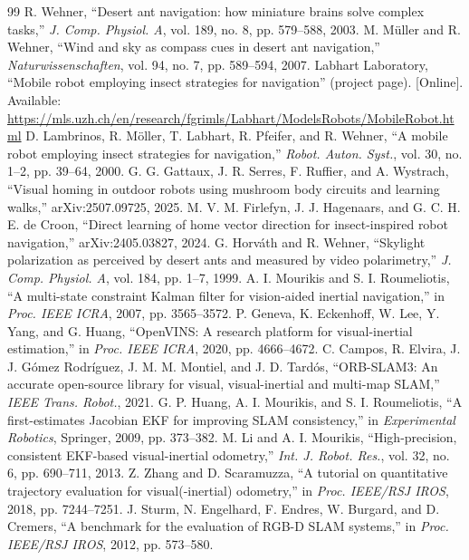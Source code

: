 \begin{thebibliography}{99}
 R. Wehner, ``Desert ant navigation: how miniature brains solve complex tasks,'' \emph{J. Comp. Physiol. A}, vol. 189, no. 8, pp. 579--588, 2003.
 M. M\"uller and R. Wehner, ``Wind and sky as compass cues in desert ant navigation,'' \emph{Naturwissenschaften}, vol. 94, no. 7, pp. 589--594, 2007.
 Labhart Laboratory, ``Mobile robot employing insect strategies for navigation'' (project page). [Online]. Available: \url{https://mls.uzh.ch/en/research/fgrimls/Labhart/ModelsRobots/MobileRobot.html}
 D. Lambrinos, R. M\"oller, T. Labhart, R. Pfeifer, and R. Wehner, ``A mobile robot employing insect strategies for navigation,'' \emph{Robot. Auton. Syst.}, vol. 30, no. 1--2, pp. 39--64, 2000.
 G. G. Gattaux, J. R. Serres, F. Ruffier, and A. Wystrach, ``Visual homing in outdoor robots using mushroom body circuits and learning walks,'' arXiv:2507.09725, 2025.
 M. V. M. Firlefyn, J. J. Hagenaars, and G. C. H. E. de Croon, ``Direct learning of home vector direction for insect-inspired robot navigation,'' arXiv:2405.03827, 2024.
 G. Horv\'ath and R. Wehner, ``Skylight polarization as perceived by desert ants and measured by video polarimetry,'' \emph{J. Comp. Physiol. A}, vol. 184, pp. 1--7, 1999.
 A. I. Mourikis and S. I. Roumeliotis, ``A multi-state constraint Kalman filter for vision-aided inertial navigation,'' in \emph{Proc. IEEE ICRA}, 2007, pp. 3565--3572.
 P. Geneva, K. Eckenhoff, W. Lee, Y. Yang, and G. Huang, ``OpenVINS: A research platform for visual-inertial estimation,'' in \emph{Proc. IEEE ICRA}, 2020, pp. 4666--4672.
 C. Campos, R. Elvira, J. J. G\'omez Rodr\'iguez, J. M. M. Montiel, and J. D. Tard\'os, ``ORB-SLAM3: An accurate open-source library for visual, visual-inertial and multi-map SLAM,'' \emph{IEEE Trans. Robot.}, 2021.
 G. P. Huang, A. I. Mourikis, and S. I. Roumeliotis, ``A first-estimates Jacobian EKF for improving SLAM consistency,'' in \emph{Experimental Robotics}, Springer, 2009, pp. 373--382.
 M. Li and A. I. Mourikis, ``High-precision, consistent EKF-based visual-inertial odometry,'' \emph{Int. J. Robot. Res.}, vol. 32, no. 6, pp. 690--711, 2013.
 Z. Zhang and D. Scaramuzza, ``A tutorial on quantitative trajectory evaluation for visual(-inertial) odometry,'' in \emph{Proc. IEEE/RSJ IROS}, 2018, pp. 7244--7251.
 J. Sturm, N. Engelhard, F. Endres, W. Burgard, and D. Cremers, ``A benchmark for the evaluation of RGB-D SLAM systems,'' in \emph{Proc. IEEE/RSJ IROS}, 2012, pp. 573--580.

\end{thebibliography}
